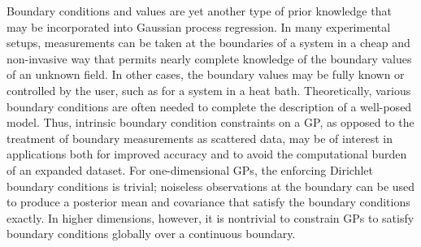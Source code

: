 \label{sec:boundary_constraints}
Boundary conditions and values are yet another type of prior knowledge that may be incorporated into Gaussian process regression.   
In many experimental setups, measurements can be taken at the boundaries of a system in a cheap and non-invasive way that permits nearly complete knowledge of the boundary values of an unknown field. In other cases, the boundary values may be fully known or controlled by the user, such as for a system in a heat bath. Theoretically, various boundary conditions are often needed to complete the description of a well-posed model. Thus, intrinsic boundary condition constraints on a GP, as opposed to the treatment of boundary measurements as scattered data, may be of interest in applications both for improved accuracy and to avoid the computational burden of an expanded dataset. For one-dimensional GPs, the enforcing Dirichlet boundary conditions is trivial; noiseless observations at the boundary can be used to produce a posterior mean and covariance that satisfy the boundary conditions exactly. In higher dimensions, however, it is nontrivial to constrain GPs to satisfy boundary conditions globally over a continuous boundary. 

